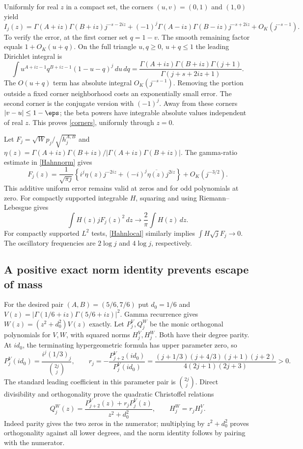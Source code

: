 Uniformly for real $z$ in a compact set, the corners $(u,v)=(0,1)$
and $(1,0)$ yield
\begin{equation}\label{corners}
 I_j(z)=\Gamma(A+iz)\Gamma(B+iz)j^{-s-2iz}
  +(-1)^j\Gamma(A-iz)\Gamma(B-iz)j^{-s+2iz}+O_K(j^{-s-1}).
\end{equation}
To verify the error, at the first corner set $q=1-v$. The smooth
remaining factor equals $1+O_K(u+q)$. On the full triangle
$u,q\ge0$, $u+q\le1$ the leading Dirichlet integral is
\[
 \int u^{A+iz-1}q^{B+iz-1}(1-u-q)^j\,du\,dq
 =\frac{\Gamma(A+iz)\Gamma(B+iz)\Gamma(j+1)}
        {\Gamma(j+s+2iz+1)}.
\]
The $O(u+q)$ term has absolute integral $O_K(j^{-s-1})$.
Removing the portion outside a fixed corner neighborhood costs an
exponentially small error. The second corner is the conjugate version
with $(-1)^j$. Away from these corners $|v-u|\le1-\eps$; the beta
powers have integrable absolute values independent of real $z$.
This proves \eqref{corners}, uniformly through $z=0$.

Let $F_j=\sqrt Wp_j/\sqrt{h_j^{A,B}}$ and
$\eta(z)=\Gamma(A+iz)\Gamma(B+iz)/|\Gamma(A+iz)\Gamma(B+iz)|$.
The gamma-ratio estimate in \eqref{Hahnnorm} gives
\begin{equation}\label{Hahnlocal}
 F_j(z)=\frac1{\sqrt{\pi j}}
 \left\{i^j\eta(z)j^{-2iz}+(-i)^j\overline{\eta(z)}j^{2iz}\right\}
          +O_K(j^{-3/2}).
\end{equation}
This additive uniform error remains valid at zeros and for odd
polynomials at zero. For compactly supported integrable $H$, squaring
and using Riemann--Lebesgue gives
\begin{equation}\label{localmeasure}
 \int H(z)jF_j(z)^2\,dz\longrightarrow\frac2\pi\int H(z)\,dz.
\end{equation}
For compactly supported $L^2$ tests, \eqref{Hahnlocal} similarly
implies $\int H\sqrt jF_j\to0$. The oscillatory frequencies are
$2\log j$ and $4\log j$, respectively.

\subsection{A positive exact norm identity prevents escape of mass}
For the desired pair $(A,B)=(5/6,7/6)$ put $d_0=1/6$ and
$V(z)=|\Gamma(1/6+iz)\Gamma(5/6+iz)|^2$. Gamma recurrence gives
$W(z)=(z^2+d_0^2)V(z)$ exactly. Let $P_j^V,Q_j^W$ be the monic
orthogonal polynomials for $V,W$, with squared norms $H_j^V,H_j^W$.
Both have their degree parity. At $id_0$, the terminating
hypergeometric formula has upper parameter zero, so
\[
 P_j^V(id_0)=\frac{i^j(1/3)_j}{\binom{2j}{j}},\qquad
 r_j=-\frac{P_{j+2}^V(id_0)}{P_j^V(id_0)}
 =\frac{(j+1/3)(j+4/3)(j+1)(j+2)}{4(2j+1)(2j+3)}>0.
\]
The standard leading coefficient in this parameter pair is
$\binom{2j}{j}$. Direct divisibility and orthogonality prove the
quadratic Christoffel relations
\begin{equation}\label{Christoffel}
 Q_j^W(z)=\frac{P_{j+2}^V(z)+r_jP_j^V(z)}{z^2+d_0^2},\qquad
 H_j^W=r_jH_j^V.
\end{equation}
Indeed parity gives the two zeros in the numerator; multiplying by
$z^2+d_0^2$ proves orthogonality against all lower degrees, and the
norm identity follows by pairing with the numerator.

